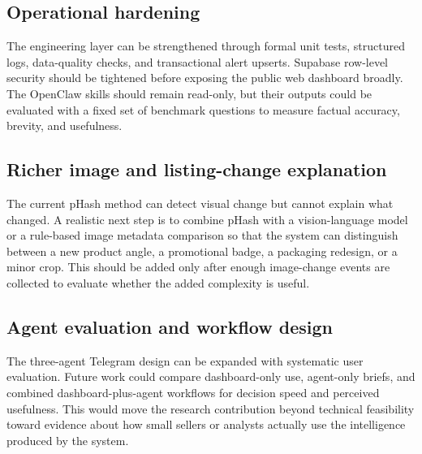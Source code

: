 \subsection{Operational hardening}

The engineering layer can be strengthened through formal unit tests, structured logs, data-quality checks, and transactional alert upserts. Supabase row-level security should be tightened before exposing the public web dashboard broadly. The OpenClaw skills should remain read-only, but their outputs could be evaluated with a fixed set of benchmark questions to measure factual accuracy, brevity, and usefulness.

\subsection{Richer image and listing-change explanation}

The current pHash method can detect visual change but cannot explain what changed. A realistic next step is to combine pHash with a vision-language model or a rule-based image metadata comparison so that the system can distinguish between a new product angle, a promotional badge, a packaging redesign, or a minor crop. This should be added only after enough image-change events are collected to evaluate whether the added complexity is useful.

\subsection{Agent evaluation and workflow design}

The three-agent Telegram design can be expanded with systematic user evaluation. Future work could compare dashboard-only use, agent-only briefs, and combined dashboard-plus-agent workflows for decision speed and perceived usefulness. This would move the research contribution beyond technical feasibility toward evidence about how small sellers or analysts actually use the intelligence produced by the system.
